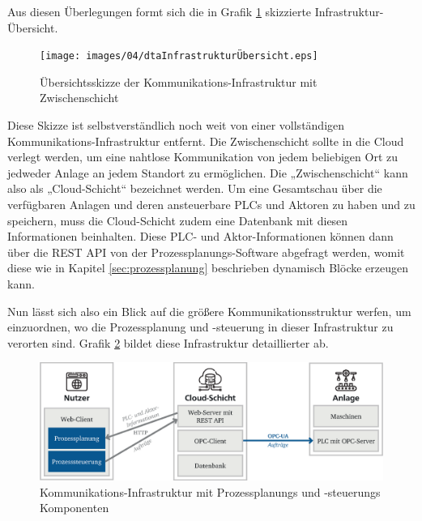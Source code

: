 Aus diesen Überlegungen formt sich die in Grafik \ref{fig:dtaInfrastrukturÜbersicht} skizzierte Infrastruktur-Übersicht.
%
\begin{figure}[htbp]
	\centering\texttt{[image: images/04/dtaInfrastrukturÜbersicht.eps]}
    \caption{Übersichtsskizze der Kommunikations-Infrastruktur mit Zwischenschicht}
    \label{fig:dtaInfrastrukturÜbersicht}
\end{figure}

Diese Skizze ist selbstverständlich noch weit von einer vollständigen Kommunikations-Infrastruktur entfernt. Die Zwischenschicht sollte in die Cloud verlegt werden, um eine nahtlose Kommunikation von jedem beliebigen Ort zu jedweder Anlage an jedem Standort zu ermöglichen. Die „Zwischenschicht“ kann also als „Cloud-Schicht“ bezeichnet werden. Um eine Gesamtschau über die verfügbaren Anlagen und deren ansteuerbare PLCs und Aktoren zu haben und zu speichern, muss die Cloud-Schicht zudem eine Datenbank mit diesen Informationen beinhalten. Diese PLC- und Aktor-Informationen können dann über die REST API von der Prozessplanungs-Software abgefragt werden, womit diese wie in Kapitel \ref{sec:prozessplanung} beschrieben dynamisch Blöcke erzeugen kann.

Nun lässt sich also ein Blick auf die größere Kommunikationsstruktur werfen, um einzuordnen, wo die Prozessplanung und -steuerung in dieser Infrastruktur zu verorten sind. Grafik \ref{fig:dtaInfrastruktur} bildet diese Infrastruktur detaillierter ab.
%
\begin{figure}[htbp]
	\centering\includegraphics[width=1.0\textwidth]{images/04/dtaInfrastruktur.eps}
    \caption{Kommunikations-Infrastruktur mit Prozessplanungs und -steuerungs Komponenten}
    \label{fig:dtaInfrastruktur}
\end{figure}

